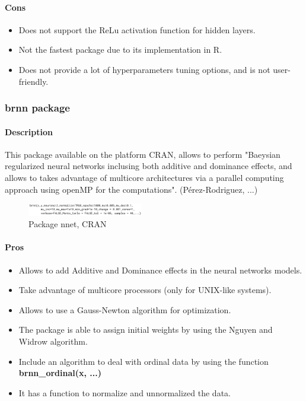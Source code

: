 \documentclass[letter]{article}\usepackage[]{graphicx}\usepackage[]{color}
\begin{document}
\paragraph{Cons}
\begin{itemize}
\item Does not support the ReLu activation function for hidden layers.
\item Not the fastest package due to its implementation in R.
\item Does not provide a lot of hyperparameters tuning options, and is not user-friendly.
\end{itemize}

\subsubsection{brnn package}
\paragraph{Description}
This package available on the platform CRAN, allows to perform "Baeysian regularized neural networks inclusing both additive and dominance effects, and allows to takes advantage of multicore architectures via a parallel computing approach using openMP for the computations". (Pérez-Rodriguez, ...)
\begin{figure}[h]
    \centering
    \includegraphics[width=0.45\textwidth]{figure/brnn_package.png}
     \caption{Package nnet, CRAN}
\end{figure}
\paragraph{Pros}
\begin{itemize}
\item Allows to add Additive and Dominance effects in the neural networks models.
\item Take advantage of multicore processors (only for UNIX-like systems).
\item Allows to use a Gauss-Newton algorithm for optimization.
\item The package is able to assign initial weights by using the Nguyen and Widrow algorithm.
\item Include an algorithm to deal with ordinal data by using the function \textbf{brnn\_ordinal(x, ...)}
\item It has a function to normalize and unnormalized the data.
\end{itemize}
\end{document}
